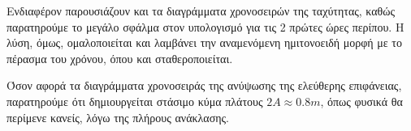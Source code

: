 Ενδιαφέρον παρουσιάζουν και τα διαγράμματα χρονοσειρών της ταχύτητας, καθώς παρατηρούμε το μεγάλο σφάλμα στον υπολογισμό για τις 2 πρώτες ώρες περίπου. Η λύση, όμως, ομαλοποιείται και λαμβάνει την αναμενόμενη ημιτονοειδή μορφή με το πέρασμα του χρόνου, όπου και σταθεροποιείται.

Όσον αφορά τα διαγράμματα χρονοσειράς της ανύψωσης της ελεύθερης επιφάνειας, παρατηρούμε ότι δημιουργείται στάσιμο κύμα πλάτους $2Α \approx 0.8m$, όπως φυσικά θα περίμενε κανείς, λόγω της πλήρους ανάκλασης.